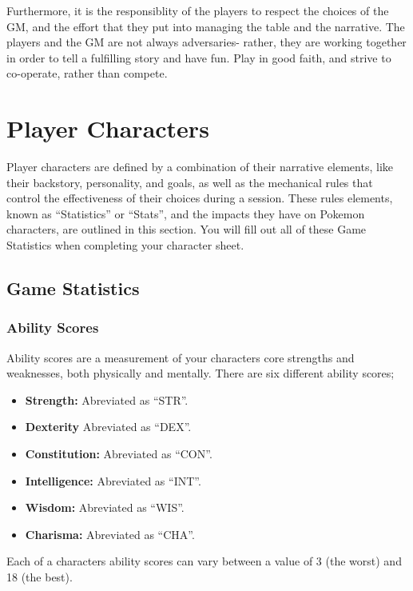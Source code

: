 \documentclass[
  11pt,
  letterpaper,
]{scrbook}
\providecommand{\tightlist}{%
  \setlength{\itemsep}{0pt}\setlength{\parskip}{0pt}}
\begin{document}
Furthermore, it is the responsiblity of the players to respect the
choices of the GM, and the effort that they put into managing the table
and the narrative. The players and the GM are not always adversaries-
rather, they are working together in order to tell a fulfilling story
and have fun. Play in good faith, and strive to co-operate, rather than
compete.

\chapter{Player Characters}\label{player-characters-1}

Player characters are defined by a combination of their narrative
elements, like their backstory, personality, and goals, as well as the
mechanical rules that control the effectiveness of their choices during
a session. These rules elements, known as ``Statistics'' or ``Stats'',
and the impacts they have on Pokemon characters, are outlined in this
section. You will fill out all of these Game Statistics when completing
your character sheet.

\section{Game Statistics}\label{game-statistics}

\subsection{Ability Scores}\label{ability-scores}

Ability scores are a measurement of your characters core strengths and
weaknesses, both physically and mentally. There are six different
ability scores;

\begin{itemize}
\tightlist
\item
  \textbf{Strength:} Abreviated as ``STR''.
\item
  \textbf{Dexterity} Abreviated as ``DEX''.
\item
  \textbf{Constitution:} Abreviated as ``CON''.
\item
  \textbf{Intelligence:} Abreviated as ``INT''.
\item
  \textbf{Wisdom:} Abreviated as ``WIS''.
\item
  \textbf{Charisma:} Abreviated as ``CHA''.
\end{itemize}

Each of a characters ability scores can vary between a value of 3 (the
worst) and 18 (the best).
\end{document}
